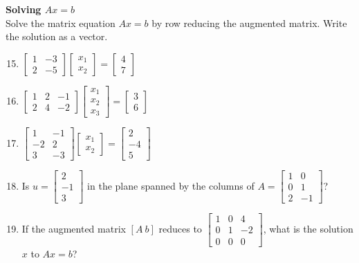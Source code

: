 \documentclass[12pt]{article}
\begin{document}
\textbf{Solving $Ax=b$} \\
Solve the matrix equation $Ax=b$ by row reducing the augmented matrix. Write the solution as a vector.
\begin{enumerate}
\setcounter{enumi}{14}
    \item $\begin{bmatrix} 1 & -3 \\ 2 & -5 \end{bmatrix} \begin{bmatrix} x_1 \\ x_2 \end{bmatrix} = \begin{bmatrix} 4 \\ 7 \end{bmatrix}$
    \item $\begin{bmatrix} 1 & 2 & -1 \\ 2 & 4 & -2 \end{bmatrix} \begin{bmatrix} x_1 \\ x_2 \\ x_3 \end{bmatrix} = \begin{bmatrix} 3 \\ 6 \end{bmatrix}$
    \item $\begin{bmatrix} 1 & -1 \\ -2 & 2 \\ 3 & -3 \end{bmatrix} \begin{bmatrix} x_1 \\ x_2 \end{bmatrix} = \begin{bmatrix} 2 \\ -4 \\ 5 \end{bmatrix}$
    \item Is $u = \begin{bmatrix} 2 \\ -1 \\ 3 \end{bmatrix}$ in the plane spanned by the columns of $A = \begin{bmatrix} 1 & 0 \\ 0 & 1 \\ 2 & -1 \end{bmatrix}$?
    \item If the augmented matrix $[A \ b]$ reduces to $\begin{bmatrix} 1 & 0 & 4 \\ 0 & 1 & -2 \\ 0 & 0 & 0 \end{bmatrix}$, what is the solution $x$ to $Ax=b$?
\end{enumerate}
\end{document}
